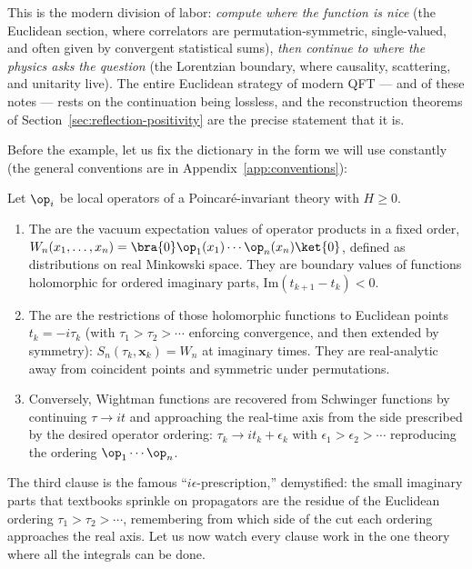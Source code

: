 This is the modern division of labor: \emph{compute
where the function is nice} (the Euclidean section, where correlators are
permutation-symmetric, single-valued, and often given by convergent statistical
sums), \emph{then continue to where the physics asks the question} (the
Lorentzian boundary, where causality, scattering, and unitarity live). The
entire Euclidean strategy of modern QFT --- and of these notes --- rests on the
continuation being lossless, and the reconstruction theorems of
Section~\ref{sec:reflection-positivity} are the precise statement that it is.

Before the example, let us fix the dictionary in the form we will use
constantly (the general conventions are in Appendix~\ref{app:conventions}):

\begin{ddefinition}
\label{def:wightman-schwinger}
Let $\op_i$ be local operators of a Poincar\'e-invariant theory with $H \ge 0$.
\begin{enumerate}
\item The  are the vacuum expectation values of
operator products in a fixed order, $W_n(x_1, \dots, x_n) = \bra{0}\op_1(x_1)
\cdots \op_n(x_n)\ket{0}$, defined as distributions on real Minkowski space.
They are boundary values of functions holomorphic for ordered imaginary parts,
$\mathrm{Im}(t_{k+1} - t_k) < 0$.
\item The  are the restrictions of those holomorphic
functions to Euclidean points $t_k = -i\tau_k$ (with $\tau_1 > \tau_2 > \cdots$
enforcing convergence, and then extended by symmetry): $S_n(\tau_k, \mathbf{x}_k) =
W_n$ at imaginary times. They are real-analytic away from coincident points and
symmetric under permutations.
\item Conversely, Wightman functions are recovered from Schwinger functions by
continuing $\tau \to it$ and approaching the real-time axis from the side
prescribed by the desired operator ordering: $\tau_k \to i t_k + \epsilon_k$
with $\epsilon_1 > \epsilon_2 > \cdots$ reproducing the ordering $\op_1 \cdots
\op_n$.
\end{enumerate}
\end{ddefinition}

\noin The third clause is the famous ``$i\epsilon$-prescription,'' demystified:
the small imaginary parts that textbooks sprinkle on propagators are the
residue of the Euclidean ordering $\tau_1 > \tau_2 > \cdots$, remembering from
which side of the cut each ordering approaches the real axis. Let us now watch
every clause work in the one theory where all the integrals can be done.

